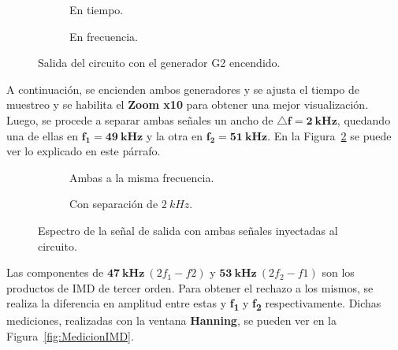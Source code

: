     \begin{figure}[H]
      \centering
      \begin{subfigure}[H]{0.44\textwidth}
        \caption{En tiempo.}
      \end{subfigure}
      \hfill 
      \begin{subfigure}[H]{0.43\textwidth}
        \caption{En frecuencia.}
      \end{subfigure}

      \caption{Salida del circuito con el generador G2 encendido.}
      \label{fig:SalidaCircuitConG2Encendido}
    \end{figure}

    A continuación, se encienden ambos generadores y se ajusta el tiempo de muestreo y se habilita el \textbf{Zoom x10}
    para obtener una mejor visualización. Luego, se procede a separar ambas señales un ancho de $\mathbf{\triangle f=  2~kHz}$,
    quedando una de ellas en $\mathbf{f_1=49~kHz}$ y la otra en $\mathbf{f_2=51~kHz}$. En la
    Figura~\ref{fig:SalidaConAmbosGeneradores} se puede ver lo explicado en este párrafo.

    \begin{figure}[H]
      \centering
      \begin{subfigure}[H]{0.48\textwidth}
        \caption{Ambas a la misma frecuencia.}
      \end{subfigure}
      \hfill 
      \begin{subfigure}[H]{0.48\textwidth}
        \caption{Con separación de $2~kHz$.}
      \end{subfigure}

      \caption{Espectro de la señal de salida con ambas señales inyectadas al circuito.}
      \label{fig:SalidaConAmbosGeneradores}
    \end{figure}

    Las componentes de $\mathbf{47~kHz}\  (2f_1 - f2)$ y $\mathbf{53~kHz}\  (2f_2 - f1)$ son los productos de IMD de 
    tercer orden. Para obtener el rechazo a los mismos, se realiza la diferencia en amplitud entre estas y 
    \textbf{f\textsubscript{1}} y \textbf{f\textsubscript{2}} respectivamente. Dichas mediciones,
    realizadas con la ventana \textbf{Hanning}, se pueden ver en la Figura~\ref{fig:MedicionIMD}.

